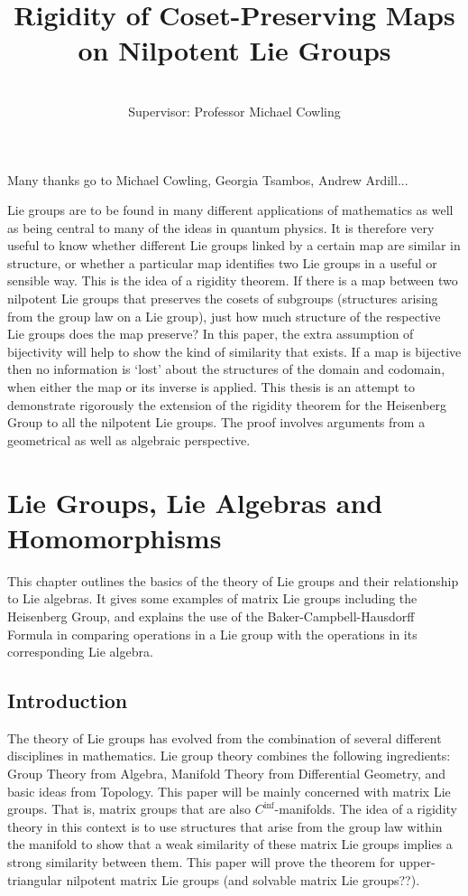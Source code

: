 \documentclass[honours]{UNSWthesis}
\title{Rigidity of Coset-Preserving Maps on Nilpotent Lie Groups}
\author{\Authornameonly\\{\bigskip}Supervisor: Professor Michael Cowling}
\newcommand{\1}{\mathbf{e}_{1}}
\newcommand{\2}{\mathbf{e}_{3}}
\newcommand{\3}{\mathbf{e}_{3}}
\begin{document}
\maketitle

{\noindent}Many thanks go to Michael Cowling, Georgia Tsambos, Andrew Ardill...


Lie groups are to be found in many different applications of mathematics as well as being central to many of the ideas in quantum physics. It is therefore very useful to know whether different Lie groups linked by a certain map are similar in structure, or whether a particular map identifies two Lie groups in a useful or sensible way. This is the idea of a rigidity theorem. If there is a map between two nilpotent Lie groups that preserves the cosets of subgroups (structures arising from the group law on a Lie group), just how much structure of the respective Lie groups does the map preserve? In this paper, the extra assumption of bijectivity will help to show the kind of similarity that exists. If a map is bijective then no information is `lost' about the structures of the domain and codomain, when either the map or its inverse is applied. 
This thesis is an attempt to demonstrate rigorously the extension of the rigidity theorem for the Heisenberg Group to all the nilpotent Lie groups. The proof involves arguments from a geometrical as well as algebraic perspective. 


\chapter{Lie Groups, Lie Algebras and Homomorphisms}
This chapter outlines the basics of the theory of Lie groups and their relationship to Lie algebras. It gives some examples of matrix Lie groups including the Heisenberg Group, and explains the use of the Baker-Campbell-Hausdorff Formula in comparing operations in a Lie group with the operations in its corresponding Lie algebra. 

\section{Introduction}
The theory of Lie groups has evolved from the combination of several different disciplines in mathematics. Lie group theory combines the following ingredients: Group Theory from Algebra, Manifold Theory from Differential Geometry, and basic ideas from Topology. This paper will be mainly concerned with matrix Lie groups. That is, matrix groups that are also $C^{\inf}$-manifolds. The idea of a rigidity theory in this context is to use structures that arise from the group law within the manifold to show that a weak similarity of these matrix Lie groups implies a strong similarity between them. This paper will prove the theorem for upper-triangular nilpotent matrix Lie groups (and solvable matrix Lie groups??).
\end{document}
